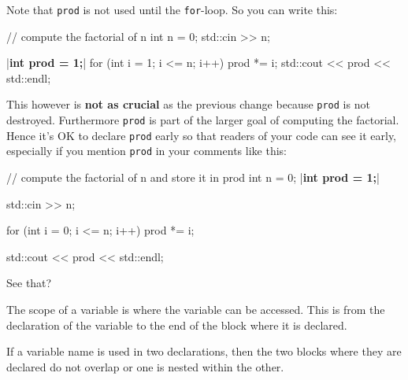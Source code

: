 Note that \texttt{prod} is not used until the \texttt{for}-loop. So you can
write this:

\begin{consolethree}[escapeinside=||]
// compute the factorial of n
int n = 0;
std::cin >> n;

|\textbf{int prod = 1;}|
for (int i = 1; i <= n; i++)
{    
     prod *= i;
}
std::cout << prod << std::endl;
\end{consolethree}

This however is \textbf{not as crucial} as the previous change because \texttt{prod} is not destroyed. Furthermore \texttt{prod} is part of the larger goal of computing the factorial. Hence it's OK to declare \texttt{prod} early so that readers of your code can see it early, especially if you mention \texttt{prod} in your comments like this:

\begin{consolethree}[escapeinside=||]
// compute the factorial of n and store it in prod
int n = 0;
|\textbf{int prod = 1;}|

std::cin >> n;

for (int i = 0; i <= n; i++)
{    
     prod *= i;
}

std::cout << prod << std::endl;
\end{consolethree}

See that?




\newpage{}
The scope of a variable is where the variable can be accessed. This is
from the declaration of the variable to the end of the block where it is
declared.


If a variable name is used in two declarations, then the two blocks
where they are declared do not overlap or one is nested within the
other.

